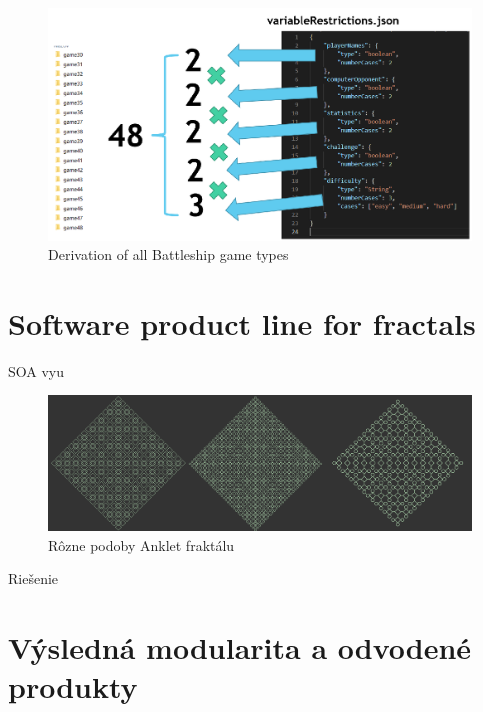 \documentclass[11pt,slovak,a4paper,twoside]{article}
\begin{document}
\begin{figure}[H]  %
					\begin{center}
									\includegraphics[width=\linewidth]{fig/allCases.png}
									\caption{Derivation of all Battleship game types}
									\label{derivationBattleshipTypes}
					\end{center}
\end{figure}


\section{Software product line for fractals} \label{distributedSOA}

SOA vyu\ 

\begin{figure}[H]  %
					\begin{center}
									\includegraphics[width=\linewidth]{fig/fractalsAnklet.png}
									\caption{Rôzne podoby Anklet fraktálu}
									\label{ankletFractalTypes}
					\end{center}
\end{figure}

Rie\v{s}enie      


\section{Výsledná modularita a odvodené produkty} \label{eval}
\end{document}

